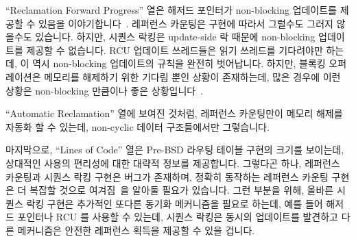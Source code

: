 ``Reclamation Forward Progress'' 열은 해저드 포인터가 non-blocking
업데이트를 제공할 수 있음을 이야기합니다~\cite{MagedMichael04a,HerlihyLM02}.
레퍼런스 카운팅은 구현에 따라서 그럴수도 그러지 않을수도 있습니다.
하지만, 시퀀스 락킹은 update-side 락 때문에 non-blocking 업데이트를 제공할 수
없습니다.
RCU 업데이트 쓰레드들은 읽기 쓰레드를 기다려야만 하는데, 이 역시 non-blocking
업데이트의 규칙을 완전히 벗어납니다.
하지만, 블록킹 오퍼레이션은 메모리를 해제하기 위한 기다림 뿐인 상황이
존재하는데, 많은 경우에 이런 상황은 non-blocking 만큼이나 좋은
상황입니다~\cite{MathieuDesnoyers2012URCU}.
\iffalse

The ``Reclamation Forward Progress'' row shows that hazard pointers
can provide non-blocking updates~\cite{MagedMichael04a,HerlihyLM02}.
Reference counting might or might not, depending on the implementation.
However, sequence locking cannot provide non-blocking updates, courtesy
of its update-side lock.
RCU updaters must wait on readers, which also rules out fully non-blocking
updates.
However, there are situations in which the only blocking operation is
a wait to free memory, which results in an situation that, for many
purposes, is as good as non-blocking~\cite{MathieuDesnoyers2012URCU}.
\fi

``Automatic Reclamation'' 열에 보여진 것처럼, 레퍼런스 카운팅만이 메모리 해제를
자동화 할 수 있는데, non-cyclic 데이터 구조들에서만 그렇습니다.

마지막으로, ``Lines of Code'' 열은 Pre-BSD 라우팅 테이블 구현의 크기를
보이는데, 상대적인 사용의 편리성에 대한 대략적 정보를 제공합니다.
그렇다곤 하나, 레퍼런스 카운팅과 시퀀스 락킹 구현은 버그가 존재하며, 정확히
동작하는 레퍼런스 카운팅 구현은 더 복잡할 것으로
여겨짐~\cite{Valois95a,MagedMichael95a}을 알아둘 필요가 있습니다.
그런 부분을 위해, 올바른 시퀀스 락킹 구현은 추가적인 또다른 동기화 메커니즘을
필요로 하는데, 예를 들어 해저드 포인터나 RCU 를 사용할 수 있는데, 시퀀스 락킹은
동시의 업데이트를 발견하고 다른 메커니즘은 안전한 레퍼런스 획득을 제공할 수
있을 겁니다.
\iffalse

As shown in the ``Automatic Reclamation'' row, only reference
counting can automate freeing of memory, and even then only
for non-cyclic data structures.

Finally, the ``Lines of Code'' row shows the size of the Pre-BSD
Routing Table implementations, giving a rough idea of relative ease of use.
That said, it is important to note that the reference-counting and
sequence-locking implementations are buggy, and that a correct
reference-counting implementation is considerably
more complex~\cite{Valois95a,MagedMichael95a}.
For its part, a correct sequence-locking implementation requires
the addition of some other synchronization mechanism, for example,
hazard pointers or RCU, so that sequence locking detects concurrent
updates and the other mechanism provides safe reference acquisition.
\fi

